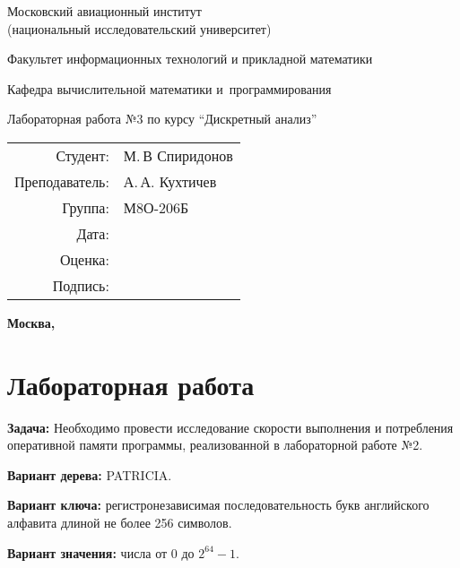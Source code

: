 \documentclass[pdf, unicode, 12pt, a4paper,oneside,fleqn]{article}
\newcommand{\CWHeader}[1]{\section*{#1}}
\newcommand{\CWProblem}[1]{\par\textbf{Задача: }#1}
\begin{document}
\begin{center}
\bfseries

{\Large Московский авиационный институт\\ (национальный исследовательский университет)

}

\vspace{48pt}

{\large Факультет информационных технологий и прикладной математики
}

\vspace{36pt}


{\large Кафедра вычислительной математики и~программирования

}


\vspace{48pt}

Лабораторная работа №3 по курсу \enquote{Дискретный анализ}

\end{center}

\vspace{72pt}

\begin{flushright}
\begin{tabular}{rl}
Студент: & М.\,В Спиридонов \\
Преподаватель: & А.\,А. Кухтичев \\
Группа: & М8О-206Б \\
Дата: & \\	
Оценка: & \\
Подпись: & \\
\end{tabular}
\end{flushright}

\vfill
\setcounter{page}{0}
\pagestyle{empty}
\begin{center}
\bfseries
Москва, \the\year
\end{center}
\pagebreak

\CWHeader{Лабораторная работа }

\CWProblem{ 
Необходимо провести исследование скорости выполнения и потребления оперативной памяти программы, реализованной в лабораторной работе №2.

{\bfseries Вариант дерева:} { PATRICIA.}

{\bfseries Вариант ключа:} { регистронезависимая последовательность букв английского алфавита длиной не более 256 символов. }

{\bfseries Вариант значения:} { числа от 0 до $2^{64} - 1$.}
}
\pagestyle{plain}
\pagebreak
\end{document}
